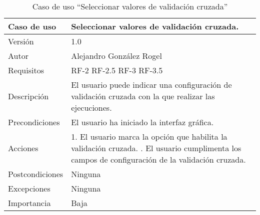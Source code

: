  
     \begin{table}
  \begin{center}
   \begin{tabular}{|>{} L{3cm} | L{9cm} |}
    \hline
    Caso de uso & Seleccionar valores de validación cruzada.\\
    \hline
    Versión & 1.0 \\
    \hline
    Autor & Alejandro González Rogel \\
    \hline
    Requisitos & RF-2\newline
    				 RF-2.5\newline
    				 RF-3\newline
    				 RF-3.5 \\
    \hline
    Descripción & El usuario puede indicar una configuración de validación cruzada con la que realizar las ejecuciones. \\
    \hline
    Precondiciones & El usuario ha iniciado la interfaz gráfica.\\
    \hline
    		Acciones & 1. El usuario marca la opción que habilita la validación cruzada. . El usuario cumplimenta los campos de configuración de la validación cruzada.\\
    \hline
    Postcondiciones & Ninguna\\
    \hline
    Excepciones & Ninguna \\
    \hline
    Importancia & Baja \\
    \hline
   \end{tabular}
   \caption{Caso de uso ``Seleccionar valores de validación cruzada''}
   \label{tabla:casoUso9}
  \end{center}
 \end{table}
 
 
 
